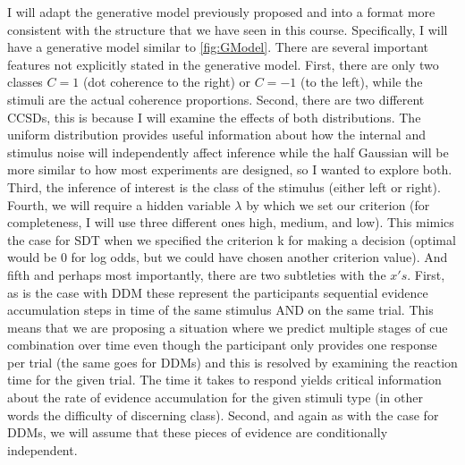 \documentclass[12pt]{article} %
\begin{document}
I will adapt the generative model previously proposed \cite{Bitzer2014} and \cite{Fard2017} into a format more consistent with the structure that we have seen in this course. Specifically, I will have a generative model similar to \cref{fig:GModel}. There are several important features not explicitly stated in the generative model. First, there are only two classes $C = 1$ (dot coherence to the right) or $C = -1$ (to the left), while the stimuli are the actual coherence proportions. Second, there are two different CCSDs, this is because I will examine the effects of both distributions. The uniform distribution provides useful information about how the internal and stimulus noise will independently affect inference while the half Gaussian will be more similar to how most experiments are designed, so I wanted to explore both. Third, the inference of interest is the class of the stimulus (either left or right). Fourth, we will require a hidden variable $\lambda$ by which we set our criterion (for completeness, I will use three different ones high, medium, and low). This mimics the case for SDT when we specified the criterion k for making a decision (optimal would be 0 for log odds, but we could have chosen another criterion value). And fifth and perhaps most importantly, there are two subtleties with the $x's$. First, as is the case with DDM these represent the participants sequential evidence accumulation steps in time of the same stimulus AND on the same trial. This means that we are proposing a situation where we predict multiple stages of cue combination over time even though the participant only provides one response per trial (the same goes for DDMs) and this is resolved by examining the reaction time for the given trial. The time it takes to respond yields critical information about the rate of evidence accumulation for the given stimuli type (in other words the difficulty of discerning class). Second, and again as with the case for DDMs, we will assume that these pieces of evidence are conditionally independent. 
\end{document}
